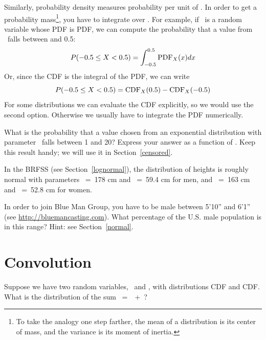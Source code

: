\documentclass[12pt]{book}
\begin{document}
Similarly, probability density measures probability per unit of \x.
In order to get a probability mass\footnote{To take the analogy one
step farther, the mean of a distribution is its center of mass, and
the variance is its moment of inertia.}, you have to integrate over \x.
For example, if \x~is a random variable whose PDF is PDF, we
can compute the probability that a value from \X~falls between 
 and 0.5:
%
\[ P(-0.5 \le X < 0.5) = \int_{-0.5}^{0.5} \mathrm{PDF}_{X}(x) dx \]
%
Or, since the CDF is the integral of the PDF, we can write
%
\[ P(-0.5 \le X < 0.5) = \mathrm{CDF}_{X}(0.5) - \mathrm{CDF}_{X}(-0.5) \]
%
For some distributions we can evaluate the CDF explicitly, so we would
use the second option.  Otherwise we usually have to integrate the
PDF numerically.

\begin{exercise}
\label{expo_pdf}

What is the probability that a value chosen from an exponential
distribution with parameter \mylambda~falls between 1 and 20?  Express
your answer as a function of \mylambda.  Keep this result handy;
we will use it in Section~\ref{censored}.

\end{exercise}


\begin{exercise}
In the BRFSS (see Section~\ref{lognormal}), the distribution of
heights is roughly normal with parameters \mymu~=~178 cm and
\sigmasq~=~59.4 cm for men, and \mymu~=~163 cm and \sigmasq~=~52.8 cm for
women.

In order to join Blue Man Group, you have to be male between 5'10''
and 6'1'' (see \url{http://bluemancasting.com}).  What percentage of the
U.S. male population is in this range?  Hint: see
Section~\ref{normal}.

\end{exercise}


\section{Convolution}

Suppose we have two random variables, \X~and \Y, 
with distributions CDF and CDF.  What is the
distribution of the sum \Z~=~\X~+~\Y?
\end{document}
